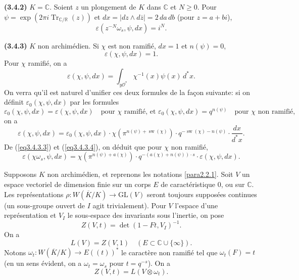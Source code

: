\documentclass[11pt,a4paper]{amsart}
\theoremstyle{plain}
\theoremstyle{definition}
\DeclareMathOperator{\Tr}{Tr}
\newcommand{\dbR}{\mathbb{R}}
\newcommand{\dbC}{\mathbb{C}}
\newcommand{\GL}{\mathrm{GL}}
\DeclareMathOperator{\sw}{sw}
\newenvironment{para}{\par\noindent}{\par}
\newcommand{\scrO}{\mathscr{O}}
\newcommand{\ov}[1]{\overline{#1}}
\newcommand{\eps}{\varepsilon}
\begin{document}
\begin{para}
\textbf{(3.4.2)} $K = \dbC$. Soient $z$ un plongement de $K$ dans $\dbC$ et $N \geq 0$. Pour $\psi = \exp(2\pi i \Tr_{\dbC/\dbR}(z))$ et $dx = |dz \wedge d\ov{z}| = 2\,da\,db$ (pour $z = a+bi$),
\[
\eps(z^{-N}\omega_{s},\psi,dx) = i^{N}.
\]
\end{para}

\begin{para}
\textbf{(3.4.3)} $K$ non archim\'edien. Si $\chi$ est non ramifi\'e, $dx = 1$ et $n(\psi) = 0$,
\begin{equation}\label{eq3.4.3.0}
\eps(\chi,\psi,dx) = 1.
\end{equation}
Pour $\chi$ ramifi\'e, on a
\begin{equation}\label{eq3.4.3.1}
\eps(\chi,\psi,dx) = \int_{y\scrO^{*}} \chi^{-1}(x) \psi(x)\, d^{*}x.
\end{equation}
On verra qu'il est naturel d'unifier ces deux formules de la fa\c{c}on suivante: si on d\'efinit $\eps_{0}(\chi,\psi,dx)$ par les formules
\begin{equation}\label{eq3.4.3.3}
\eps_{0}(\chi,\psi,dx) = \eps(\chi,\psi,dx) \quad \text{pour } \chi \text{ ramifi\'e, et } \eps_{0}(\chi,\psi,dx) = q^{n(\psi)} \quad \text{pour } \chi \text{ non ramifi\'e},
\end{equation}
on a
\begin{equation}\label{eq3.4.3.4}
\eps(\chi,\psi,dx) = \eps_{0}(\chi,\psi,dx) \cdot \chi(\pi^{n(\psi)+\sw(\chi)}) \cdot q^{-\sw(\chi)-n(\psi)} \cdot \frac{dx}{d^{*}x}.
\end{equation}
De (\ref{eq3.4.3.3}) et (\ref{eq3.4.3.4}), on d\'eduit que pour $\chi$ non ramifi\'e,
\begin{equation}\label{eq3.4.3.5}
\eps(\chi\omega_{s},\psi,dx) = \chi(\pi^{n(\psi)+a(\chi)}) \cdot q^{-(a(\chi)+n(\psi))\cdot s} \cdot \eps(\chi,\psi,dx).
\end{equation}
\end{para}

\begin{para}
Supposons $K$ non archim\'edien, et reprenons les notations \ref{para2.2.1}. Soit $V$ un espace vectoriel de dimension finie sur un corps $E$ de caract\'eristique $0$, ou sur $\dbC$. Les repr\'esentations $\rho: W(\ov{K}/K) \to \GL(V)$ seront toujours suppos\'ees continues (un sous-groupe ouvert de $I$ agit trivialement). Pour $V$ l'espace d'une repr\'esentation et $V_{I}$ le sous-espace des invariants sous l'inertie, on pose
\begin{equation}\label{eq3.5.1}
Z(V,t) = \det(1 - Ft, V_{I})^{-1}.
\end{equation}
On a
\begin{equation}\label{eq3.5.2}
L(V) = Z(V,1) \quad (E \subset \dbC \cup \{\infty\}).
\end{equation}
Notons $\omega_{t}: W(\ov{K}/K) \to E((t))^{*}$ le caract\`ere non ramifi\'e tel que $\omega_{t}(F) = t$ (en un sens \'evident, on a $\omega_{t} = \omega_{s}$ pour $t = q^{-s}$). On a
\begin{equation}\label{eq3.5.3}
Z(V,t) = L(V \otimes \omega_{t}).
\end{equation}
\end{para}
\end{document}

